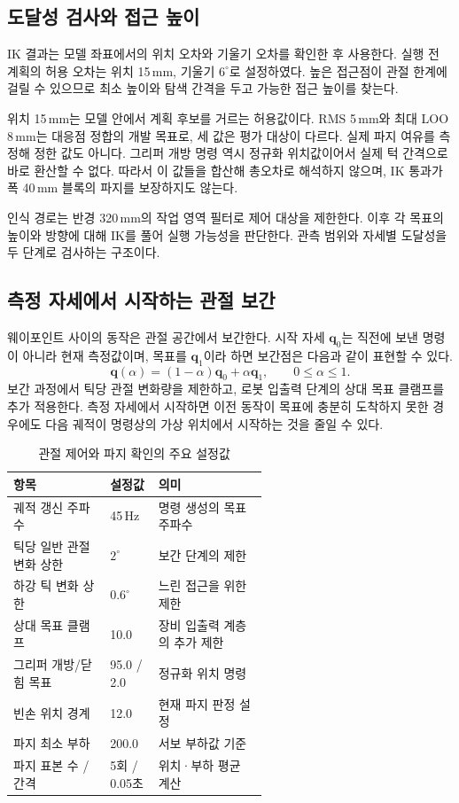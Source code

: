 \subsection{도달성 검사와 접근 높이}
IK 결과는 모델 좌표에서의 위치 오차와 기울기 오차를 확인한 후 사용한다. 실행 전 계획의 허용 오차는 위치 15\,mm, 기울기 $6^\circ$로 설정하였다. 높은 접근점이 관절 한계에 걸릴 수 있으므로 최소 높이와 탐색 간격을 두고 가능한 접근 높이를 찾는다.

위치 15\,mm는 모델 안에서 계획 후보를 거르는 허용값이다. RMS 5\,mm와 최대 LOO 8\,mm는 대응점 정합의 개발 목표로, 세 값은 평가 대상이 다르다. 실제 파지 여유를 측정해 정한 값도 아니다. 그리퍼 개방 명령 역시 정규화 위치값이어서 실제 턱 간격으로 바로 환산할 수 없다. 따라서 이 값들을 합산해 총오차로 해석하지 않으며, IK 통과가 폭 40\,mm 블록의 파지를 보장하지도 않는다.

인식 경로는 반경 320\,mm의 작업 영역 필터로 제어 대상을 제한한다. 이후 각 목표의 높이와 방향에 대해 IK를 풀어 실행 가능성을 판단한다. 관측 범위와 자세별 도달성을 두 단계로 검사하는 구조이다.

\subsection{측정 자세에서 시작하는 관절 보간}
웨이포인트 사이의 동작은 관절 공간에서 보간한다. 시작 자세 $\boldsymbol{q}_0$는 직전에 보낸 명령이 아니라 현재 측정값이며, 목표를 $\boldsymbol{q}_1$이라 하면 보간점은 다음과 같이 표현할 수 있다.
\begin{equation}
\boldsymbol{q}(\alpha)=(1-\alpha)\boldsymbol{q}_0+\alpha\boldsymbol{q}_1,
\qquad 0\leq\alpha\leq1.
\end{equation}
보간 과정에서 틱당 관절 변화량을 제한하고, 로봇 입출력 단계의 상대 목표 클램프를 추가 적용한다. 측정 자세에서 시작하면 이전 동작이 목표에 충분히 도착하지 못한 경우에도 다음 궤적이 명령상의 가상 위치에서 시작하는 것을 줄일 수 있다.

\begin{table}[htbp]
\centering
\caption{관절 제어와 파지 확인의 주요 설정값}
\begin{tabularx}{\linewidth}{@{}L{0.38\linewidth}L{0.19\linewidth}Y@{}}
\toprule
항목 & 설정값 & 의미 \\
\midrule
궤적 갱신 주파수 & 45\,Hz & 명령 생성의 목표 주파수 \\
틱당 일반 관절 변화 상한 & $2^\circ$ & 보간 단계의 제한 \\
하강 틱 변화 상한 & $0.6^\circ$ & 느린 접근을 위한 제한 \\
상대 목표 클램프 & 10.0 & 장비 입출력 계층의 추가 제한 \\
그리퍼 개방/닫힘 목표 & 95.0 / 2.0 & 정규화 위치 명령 \\
빈손 위치 경계 & 12.0 & 현재 파지 판정 설정 \\
파지 최소 부하 & 200.0 & 서보 부하값 기준 \\
파지 표본 수 / 간격 & 5회 / 0.05초 & 위치·부하 평균 계산 \\
\bottomrule
\end{tabularx}
\end{table}

